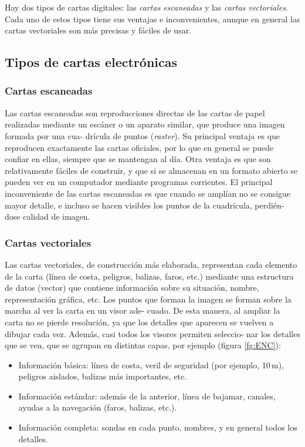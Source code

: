 Hay dos tipos de cartas digitales: las \emph{cartas escaneadas} y las 
\emph{cartas vectoriales}. Cada uno de estos tipos tiene sus ventajas e inconvenientes, 
aunque en general las cartas vectoriales son más precisas y fáciles de usar. 

\subsection{Tipos de cartas electrónicas}

\subsubsection{Cartas escaneadas}

Las cartas escaneadas son reproducciones directas de las cartas de papel realizadas 
mediante un escáner o un aparato similar, que produce una imagen formada por una cua- 
drícula de puntos (\emph{raster}). Su principal ventaja es que reproducen exactamente las cartas 
oficiales, por lo que en general se puede confiar en ellas, siempre que se mantengan al 
día. Otra ventaja es que son relativamente fáciles de construir, y que si se almacenan en 
un formato abierto se pueden ver en un computador mediante programas corrientes. 
El principal inconveniente de las cartas escaneadas es que cuando se amplían no se 
consigue mayor detalle, e incluso se hacen visibles los puntos de la cuadrícula, perdién- 
dose calidad de imagen. 

\subsubsection{Cartas vectoriales}

Las cartas vectoriales, de construcción más elaborada, representan cada elemento de la 
carta (línea de costa, peligros, balizas, faros, etc.) mediante una estructura de datos 
(vector) que contiene información sobre su situación, nombre, representación gráfica, etc. Los 
puntos que forman la imagen se forman sobre la marcha al ver la carta en un visor ade- 
cuado. De esta manera, al ampliar la carta no se pierde resolución, ya que los detalles que 
aparecen se vuelven a dibujar cada vez. Además, casi todos los visores permiten seleccio- 
nar los detalles que se ven, que se agrupan en distintas capas, por ejemplo 
(figura \ref{fg:ENC}): 
\begin{itemize}
\item  Información básica: línea de costa, veril de seguridad (por ejemplo, 10\,m), 
peligros aislados, balizas más importantes, etc. 
\item Información estándar: además de la anterior, línea de bajamar, canales, ayudas a la 
navegación (faros, balizas, etc.). 
\item Información completa: sondas en cada punto, nombres, y en general todos los 
detalles. 
\end{itemize}

